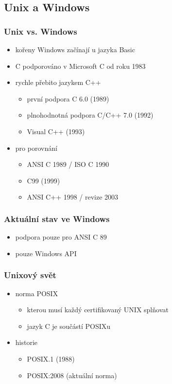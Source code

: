 \subsection{Unix a Windows}
\begin{frame}
	\frametitle{Unix vs. Windows}
	\begin{itemize}
		\item{kořeny Windows začínají u jazyka Basic}
		\item{C podporováno v Microsoft C od roku 1983}
		\item{rychle přebito jazykem C++}\pause
		\begin{itemize}
			\item{první podpora C 6.0 (1989)}
			\item{plnohodnotná podpora C/C++ 7.0 (1992)}
			\item{Visual C++ (1993)}
		\end{itemize}\pause
		\item{pro porovnání}
		\begin{itemize}
			\item{ANSI C 1989 / ISO C 1990}
			\item{C99 (1999)}
			\item{ANSI C++ 1998 / revize 2003}
		\end{itemize}
	\end{itemize}
\end{frame}

\begin{frame}
	\frametitle{Aktuální stav ve Windows}
	\begin{itemize}
		\item{podpora pouze pro ANSI C 89}
		\item{pouze Windows API}
	\end{itemize}
\end{frame}

\begin{frame}
	\frametitle{Unixový svět}
	\begin{itemize}
		\item{norma POSIX}
		\begin{itemize}
			\item{kterou musí každý certifikovaný UNIX splňovat}
			\item{jazyk C je součástí POSIXu}
		\end{itemize}
		\item{historie}
		\begin{itemize}
			\item{POSIX.1 (1988)}
			\item{POSIX:2008 (aktuální norma)}
		\end{itemize}
	\end{itemize}
\end{frame}

